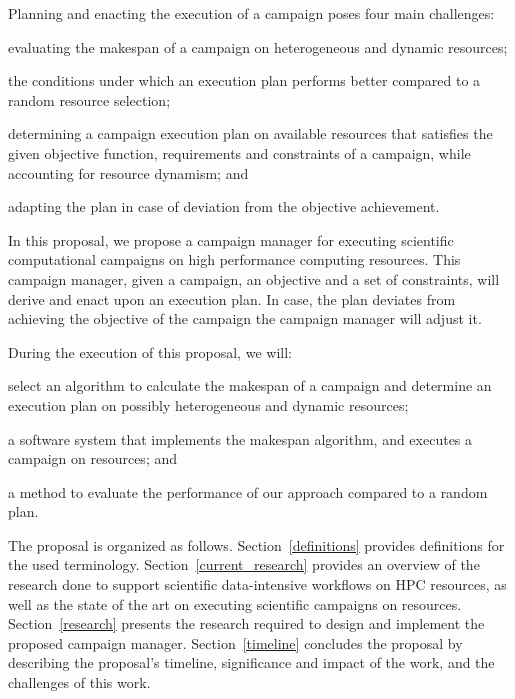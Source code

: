Planning and enacting the execution of a campaign poses four main challenges: 
\begin{inparaenum}[(i)]
\item evaluating the makespan of a campaign on heterogeneous and dynamic resources;
\item the conditions under which an execution plan performs better compared to a random resource selection;
\item determining a campaign execution plan on available resources that satisfies the given objective function, requirements and constraints of a campaign, while accounting for resource dynamism; and
\item adapting the plan in case of deviation from the objective achievement.
\end{inparaenum}

In this proposal, we propose a campaign manager for executing scientific computational campaigns on high performance computing resources.
This campaign manager, given a campaign, an objective and a set of constraints, will derive and enact upon an execution plan. 
In case, the plan deviates from achieving the objective of the campaign the campaign manager will adjust it.

During the execution of this proposal, we will:
\begin{inparaenum}[(1)]
\item select an algorithm to calculate the makespan of a campaign and determine an execution plan on possibly heterogeneous and dynamic resources;
\item a software system that implements the makespan algorithm, and executes a campaign on resources; and 
\item a method to evaluate the performance of our approach compared to a random plan. 
\end{inparaenum}

The proposal is organized as follows.
Section~\ref{definitions} provides definitions for the used terminology.
Section~\ref{current_research} provides an overview of the research done to support scientific data-intensive workflows on HPC resources, as well as the state of the art on executing scientific campaigns on resources.
Section~\ref{research} presents the research required to design and implement the proposed campaign manager.
Section~\ref{timeline} concludes the proposal by describing the proposal's timeline, significance and impact of the work, and the challenges of this work.
